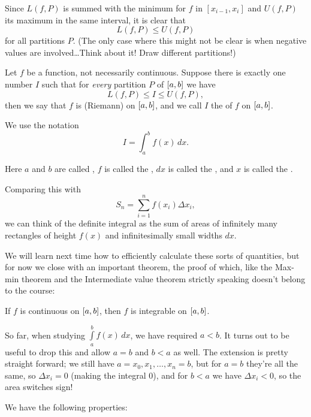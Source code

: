 \noindent
Since $L(f, P)$ is summed with the minimum for $f$ in $[x_{i - 1}, x_i]$ and $U(f, P)$ its maximum in the same interval, it is clear that
\[
	L(f, P) \leq U(f, P)
\]
for all partitions $P$.
(The only case where this might not be clear is when negative values are involved\ldots Think about it!
Draw different partitions!)

\begin{definition}
	Let $f$ be a function, not necessarily continuous.
	Suppose there is exactly one number $I$ such that for \emph{every} partition $P$ of $\interval{a}{b}$ we have
	\[
		L(f, P) \leq I \leq U(f, P),
	\]
	then we say that $f$ is (Riemann)  on $\interval{a}{b}$, and we call $I$ the  of $f$ on $\interval{a}{b}$.

	We use the notation
	\[
		I = \int_a^b f(x) \, d x.
	\]

	\noindent
	Here $a$ and $b$ are called , $f$ is called the , $d x$ is called the , and $x$ is called the .
\end{definition}

\noindent
Comparing this with
\[
	S_n = \sum_{i = 1}^n f(x_i) \Delta x_i,
\]
we can think of the definite integral as the sum of areas of infinitely many rectangles of height $f(x)$ and infinitesimally small widths $d x$.

We will learn next time how to efficiently calculate these sorts of quantities, but for now we close with an important theorem, the proof of which, like the Max-min theorem and the Intermediate value theorem strictly speaking doesn't belong to the course:

\begin{theorem}
	If $f$ is continuous on $\interval{a}{b}$, then $f$ is integrable on $\interval{a}{b}$.
\end{theorem}

\noindent
So far, when studying $\int\limits_a^b f(x) \, d x$, we have required $a < b$.
It turns out to be useful to drop this and allow $a = b$ and $b < a$ as well. The extension is pretty straight forward; we still have $a = x_0, x_1, \ldots, x_n = b$, but for $a = b$ they're all the same, so $\Delta x_i = 0$ (making the integral $0$), and for $b < a$ we have $\Delta x_i < 0$, so the area switches sign!

We have the following properties:

